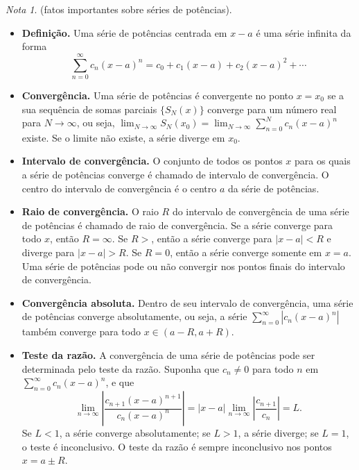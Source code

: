 \documentclass{article}
\theoremstyle{plain}
\theoremstyle{definition}
\theoremstyle{remark}
\newtheorem*{rem}{Nota}
\begin{document}
\begin{rem} (fatos importantes sobre séries de potências).
    \begin{itemize}
        \item \textbf{Definição.} Uma série de potências centrada em \(x-a\) é uma série infinita da forma \begin{equation}\sum_{n=0}^{\infty} c_n (x-a)^n = c_0 + c_1(x-a) + c_2(x-a)^2 + \cdots\end{equation}
        \item \textbf{Convergência.} Uma série de potências é convergente no ponto \(x=x_0\) se a sua sequência de somas parciais \(\{S_N(x)\}\) converge para um número real para \(N\to\infty\), ou seja, \(\lim_{N\to\infty} S_N(x_0) = \lim_{N\to\infty} \sum_{n=0}^{N} c_n (x-a)^n\) existe. Se o limite não existe, a série diverge em \(x_0\).
        \item \textbf{Intervalo de convergência.} O conjunto de todos os pontos \(x\) para os quais a série de potências converge é chamado de intervalo de convergência. O centro do intervalo de convergência é o centro \(a\) da série de potências.
        \item \textbf{Raio de convergência.} O raio \(R\) do intervalo de convergência de uma série de potências é chamado de raio de convergência. Se a série converge para todo \(x\), então \(R=\infty\). Se \(R>\), então a série converge para \(|x-a|<R\) e diverge para \(|x-a|>R\). Se \(R=0\), então a série converge somente em \(x=a\). Uma série de potências pode ou não convergir nos pontos finais do intervalo de convergência.
        \item \textbf{Convergência absoluta.} Dentro de seu intervalo de convergência, uma série de potências converge absolutamente, ou seja, a série \(\sum_{n=0}^{\infty} |c_n (x-a)^n|\) também converge para todo \(x \in (a-R, a+R)\).
        \item \textbf{Teste da razão.} A convergência de uma série de potências pode ser determinada pelo teste da razão. Suponha que \(c_n\neq0\) para todo \(n\) em \(\sum_{n=0}^{\infty} c_n (x-a)^n\), e que 
        \begin{equation}
            \lim_{n\to\infty} \left| \frac{c_{n+1}(x-a)^{n+1}}{c_n (x-a)^n} \right| = |x-a| \lim_{n\to\infty} \left| \frac{c_{n+1}}{c_n} \right| = L.
        \end{equation}
        \noindent Se \(L<1\), a série converge absolutamente; se \(L>1\), a série diverge; se \(L=1\), o teste é inconclusivo. O teste da razão é sempre inconclusivo nos pontos \(x=a\pm R\).

\end{itemize}
\end{rem}
\end{document}

